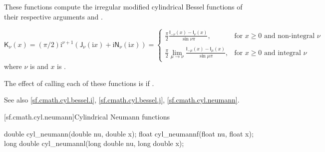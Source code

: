 \begin{itemdescr}

\pnum
\effects
These functions compute
the irregular modified cylindrical Bessel functions
of their respective arguments
 and .

\pnum
\returns
\[%
  \mathsf{K}_\nu(x) =
  (\pi/2)\mathrm{i}^{\nu+1} (            \mathsf{J}_\nu(\mathrm{i}x)
			    + \mathrm{i} \mathsf{N}_\nu(\mathrm{i}x)
			    )
  =
  \left\{
  \begin{array}{cl}
  \displaystyle
  \frac{\pi}{2}
  \frac{\mathsf{I}_{-\nu}(x) - \mathsf{I}_{\nu}(x)}
       {\sin \nu\pi },
  & \mbox{for $x \ge 0$ and non-integral $\nu$}
  \\
  \\
  \displaystyle
  \frac{\pi}{2}
  \lim_{\mu \rightarrow \nu} \frac{\mathsf{I}_{-\mu}(x) - \mathsf{I}_{\mu}(x)}
                                  {\sin \mu\pi },
  & \mbox{for $x \ge 0$ and integral $\nu$}
  \end{array}
  \right.
\]
where
$\nu$ is  and
$x$ is .

\pnum
\remarks
The effect of calling each of these functions
is 
if .

\pnum
See also \ref{sf.cmath.cyl.bessel.i}, \ref{sf.cmath.cyl.bessel.j}, \ref{sf.cmath.cyl.neumann}.
\end{itemdescr}

[sf.cmath.cyl.neumann]{Cylindrical Neumann functions}%
%
%
%
%
%
%
\begin{itemdecl}
double       cyl_neumann(double nu, double x);
float        cyl_neumannf(float nu, float x);
long double  cyl_neumannl(long double nu, long double x);
\end{itemdecl}

